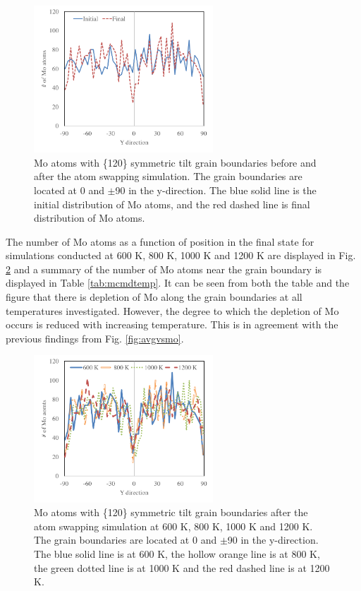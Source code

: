 \documentclass[review]{elsarticle}
\begin{document}
\begin{figure}[h]
 \centering
 \includegraphics[width=0.6\textwidth]{600mcmdA.png} 
 \caption{Mo atoms with \{120\} symmetric tilt grain boundaries before and after the atom swapping simulation. The grain boundaries are located at 0 and $\pm$90 in the y-direction. The blue solid line is the initial distribution of Mo atoms, and the red dashed line is final distribution of Mo atoms.}
 \label{fig:600mcmdA}
\end{figure}

\FloatBarrier

The number of Mo atoms as a function of position in the final state for simulations conducted at 600 K, 800 K, 1000 K and 1200 K are displayed in Fig. \ref{fig:mcmdtemp} and a summary of the number of Mo atoms near the grain boundary is displayed in Table \ref{tab:mcmdtemp}. It can be seen from both the table and the figure that there is depletion of Mo along the grain boundaries at all temperatures investigated. However, the degree to which the depletion of Mo occurs is reduced with increasing temperature. This is in agreement with the previous findings from Fig. \ref{fig:avgvsmo}. 
 
\begin{figure}[h]
 \centering
 \includegraphics[width=0.6\textwidth]{mcmdtemp.png} 
 \caption{Mo atoms with \{120\} symmetric tilt grain boundaries after the atom swapping simulation at 600 K, 800 K, 1000 K and 1200 K. The grain boundaries are located at 0 and $\pm$90 in the y-direction. The blue solid line is at 600 K, the hollow orange line is at 800 K, the green dotted line is at 1000 K and the red dashed line is at 1200 K.}
 \label{fig:mcmdtemp}
\end{figure}
\end{document}
